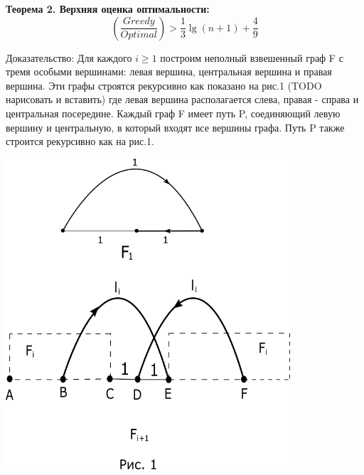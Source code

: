 \documentclass[a4paper, 14pt]{extarticle}
\begin{document}
\textbf{Теорема 2. Верхняя оценка оптимальности:}
\begin{equation}
	(\frac{Greedy}{Optimal}) > \frac{1}{3}{\lg (n+1)} + \frac{4}{9}
\end{equation}

Доказательство:  Для каждого $i \geq 1 $ построим неполный взвешенный граф F с тремя особыми вершинами: левая вершина, центральная вершина и правая вершина. Эти графы строятся рекурсивно как показано на рис.1 (TODO нарисовать и вставить) где левая вершина располагается слева, правая - справа и центральная посередине. Каждый граф F имеет путь P, соединяющий левую вершину и центральную, в который входят все вершины графа. Путь P также строится рекурсивно как на рис.1. 

\begin{center}
\includegraphics[width=300pt]{ris1.png}
\end{center}
\end{document}
